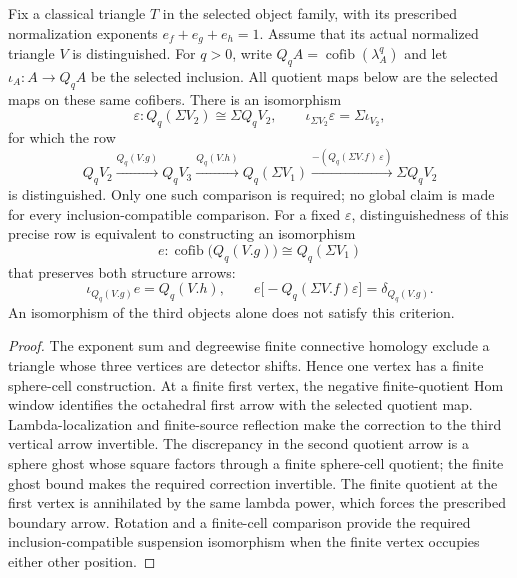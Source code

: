 \begin{theorem}
\label{sem:Literature:normalized-finite-quotient-row}
Fix a classical triangle $T$ in the selected object family, with its prescribed
normalization exponents $e_f+e_g+e_h=1$. Assume that its actual normalized
triangle $V$ is distinguished. For $q>0$, write
$Q_qA=\operatorname{cofib}(\lambda_A^q)$ and let $\iota_A:A\to Q_qA$
be the selected inclusion. All quotient maps below are the selected maps
on these same cofibers. There is an isomorphism
\[
\varepsilon:Q_q(\Sigma V_2)\cong\Sigma Q_qV_2,
\qquad
\iota_{\Sigma V_2}\varepsilon=\Sigma\iota_{V_2},
\]
for which the row
\[
Q_qV_2\xrightarrow{Q_q(V.g)}Q_qV_3
\xrightarrow{Q_q(V.h)}Q_q(\Sigma V_1)
\xrightarrow{-\left(Q_q(\Sigma V.f)\,\varepsilon\right)}
\Sigma Q_qV_2
\]
is distinguished. Only one such comparison is required; no global claim
is made for every inclusion-compatible comparison.
For a fixed $\varepsilon$, distinguishedness of this precise row is
equivalent to constructing an isomorphism
\[
e:\operatorname{cofib}\bigl(Q_q(V.g)\bigr)\cong Q_q(\Sigma V_1)
\]
that preserves both structure arrows:
\[
\iota_{Q_q(V.g)}e=Q_q(V.h),\qquad
e\bigl[-Q_q(\Sigma V.f)\varepsilon\bigr]=\delta_{Q_q(V.g)}.
\]
An isomorphism of the third objects alone does not satisfy this criterion.
\end{theorem}
\begin{proof}
The exponent sum and degreewise finite connective homology exclude a triangle whose three vertices are detector shifts. Hence one vertex has a finite sphere-cell construction. At a finite first vertex, the negative finite-quotient Hom window identifies the octahedral first arrow with the selected quotient map. Lambda-localization and finite-source reflection make the correction to the third vertical arrow invertible. The discrepancy in the second quotient arrow is a sphere ghost whose square factors through a finite sphere-cell quotient; the finite ghost bound makes the required correction invertible. The finite quotient at the first vertex is annihilated by the same lambda power, which forces the prescribed boundary arrow. Rotation and a finite-cell comparison provide the required inclusion-compatible suspension isomorphism when the finite vertex occupies either other position.
\end{proof}

